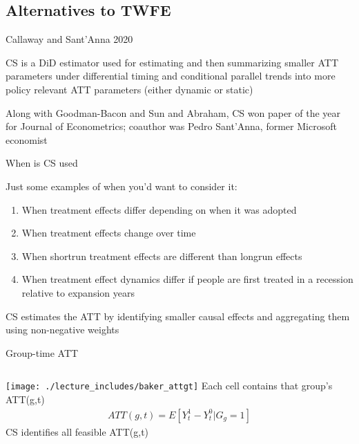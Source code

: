 \documentclass{beamer}
\begin{document}
\subsection{Alternatives to TWFE}



\begin{frame}{Callaway and Sant'Anna 2020}

CS is a DiD estimator used for estimating and then summarizing smaller ATT parameters under differential timing and conditional parallel trends into more policy relevant ATT parameters (either dynamic or static)

\bigskip

Along with Goodman-Bacon and Sun and Abraham, CS won paper of the year for Journal of Econometrics; coauthor was Pedro Sant'Anna, former Microsoft economist

\end{frame}


\begin{frame}{When is CS used}

Just some examples of when you'd want to consider it:
\begin{enumerate}
\item When treatment effects differ depending on when it was adopted
\item When treatment effects change over time
\item When shortrun treatment effects are different than longrun effects
\item When treatment effect dynamics differ if people are first treated in a recession relative to expansion years
\end{enumerate}

\bigskip

CS estimates the ATT by identifying smaller causal effects and aggregating them using non-negative weights

\end{frame}






\begin{frame}{Group-time ATT}
       \begin{columns}
             \centering
             \texttt{[image: ./lecture\_includes/baker\_attgt]}
            Each cell contains that group's ATT(g,t)
\begin{eqnarray*}
ATT(g,t) = E[Y_t^1 - Y_t^0 | G_g=1]
\end{eqnarray*}CS identifies all feasible ATT(g,t)
         \end{columns} 
    \end{frame}
\end{document}

